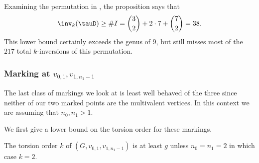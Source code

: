 \begin{example}
    Examining the permutation in , the proposition says that
\begin{align*}
    \inv_k(\tauD) \geq \#I = \binom{3}{2} + 2\cdot 7 + \binom{7}{2} = 38.
\end{align*}
This lower bound certainly exceeds the genus of $9$, but still misses most of the $217$ total $k$-inversions of this permutation.
\end{example}


\subsubsection{\texorpdfstring{Marking at $v_{0,1},v_{1,n_1-1}$}{Marking at v\_0,1 and v\_1,n1-1}}\label{subsub-bothOff}
The last class of markings we look at is least well behaved of the three since neither of our two marked points are the multivalent vertices. In this context we are assuming that $n_0,n_1>1$.

We first give a lower bound on the torsion order for these markings.
\begin{lemma}\label{lem-bothOffTorOrder}
    The torsion order $k$ of $(G,v_{0,1},v_{1,n_1-1})$ is at least $g$ unless $n_0 = n_1 = 2$ in which case $k = 2$.
\end{lemma}


